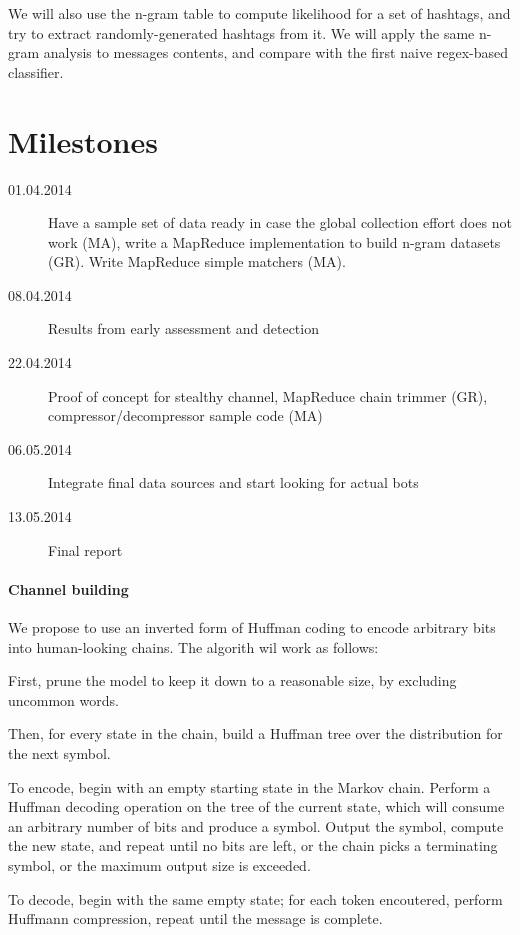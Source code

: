 \documentclass[a4paper,11pt]{article}
\begin{document}
We will also use the n-gram table to compute likelihood for a set of hashtags, and try to extract randomly-generated hashtags from it. We will apply the same n-gram analysis to messages contents, and compare with the first naive regex-based classifier.

\section{Milestones}

\begin{description}
	\item[01.04.2014] Have a sample set of data ready in case the global collection effort does not work (MA), write a MapReduce implementation to build n-gram datasets (GR). Write MapReduce simple matchers (MA).
	\item[08.04.2014] Results from early assessment and detection
	\item[22.04.2014] Proof of concept for stealthy channel, MapReduce chain trimmer (GR), compressor/decompressor sample code (MA)
	\item[06.05.2014] Integrate final data sources and start looking for actual bots
	\item[13.05.2014] Final report 
\end{description}

\appendix

\paragraph{Channel building}

We propose to use an inverted form of Huffman coding to encode arbitrary bits into human-looking chains. The algorith wil work as follows:

First, prune the model to keep it down to a reasonable size, by excluding uncommon words.

Then, for every state in the chain, build a Huffman tree over the distribution for the next symbol.

To encode, begin with an empty starting state in the Markov chain. Perform a Huffman decoding operation on the tree of the current state, which will consume an arbitrary number of bits and produce a symbol. Output the symbol, compute the new state, and repeat until no bits are left, or the chain picks a terminating symbol, or the maximum output size is exceeded.

To decode, begin with the same empty state; for each token encoutered, perform Huffmann compression, repeat until the message is complete.
\end{document}
